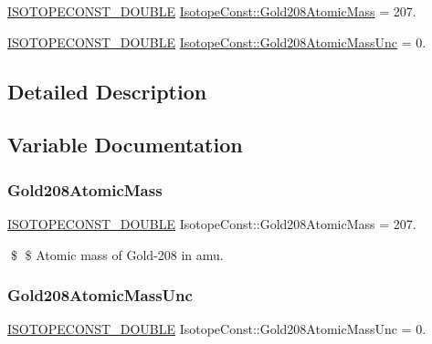 \begin{DoxyCompactItemize}
\item 
\mbox{\hyperlink{group___isotope_const-_macros_ga8f45a7272ce02c0b4c65c44636ed719a}{I\+S\+O\+T\+O\+P\+E\+C\+O\+N\+S\+T\+\_\+\+D\+O\+U\+B\+LE}} \mbox{\hyperlink{group___isotope_const-_gold-_au208_ga0bd3180df8a907c4abe7cd3c22c7ed11}{Isotope\+Const\+::\+Gold208\+Atomic\+Mass}} = 207.
\item 
\mbox{\hyperlink{group___isotope_const-_macros_ga8f45a7272ce02c0b4c65c44636ed719a}{I\+S\+O\+T\+O\+P\+E\+C\+O\+N\+S\+T\+\_\+\+D\+O\+U\+B\+LE}} \mbox{\hyperlink{group___isotope_const-_gold-_au208_ga40c200cc2a19738d2731aabb38ce2324}{Isotope\+Const\+::\+Gold208\+Atomic\+Mass\+Unc}} = 0.
\end{DoxyCompactItemize}


\subsection{Detailed Description}


\subsection{Variable Documentation}
\mbox{\label{group___isotope_const-_gold-_au208_ga0bd3180df8a907c4abe7cd3c22c7ed11}} 
\subsubsection{\texorpdfstring{Gold208\+Atomic\+Mass}{Gold208AtomicMass}}
{\footnotesize\ttfamily \mbox{\hyperlink{group___isotope_const-_macros_ga8f45a7272ce02c0b4c65c44636ed719a}{I\+S\+O\+T\+O\+P\+E\+C\+O\+N\+S\+T\+\_\+\+D\+O\+U\+B\+LE}} Isotope\+Const\+::\+Gold208\+Atomic\+Mass = 207.}

\$ \$ Atomic mass of Gold-\/208 in amu. \mbox{\label{group___isotope_const-_gold-_au208_ga40c200cc2a19738d2731aabb38ce2324}} 
\subsubsection{\texorpdfstring{Gold208\+Atomic\+Mass\+Unc}{Gold208AtomicMassUnc}}
{\footnotesize\ttfamily \mbox{\hyperlink{group___isotope_const-_macros_ga8f45a7272ce02c0b4c65c44636ed719a}{I\+S\+O\+T\+O\+P\+E\+C\+O\+N\+S\+T\+\_\+\+D\+O\+U\+B\+LE}} Isotope\+Const\+::\+Gold208\+Atomic\+Mass\+Unc = 0.}

